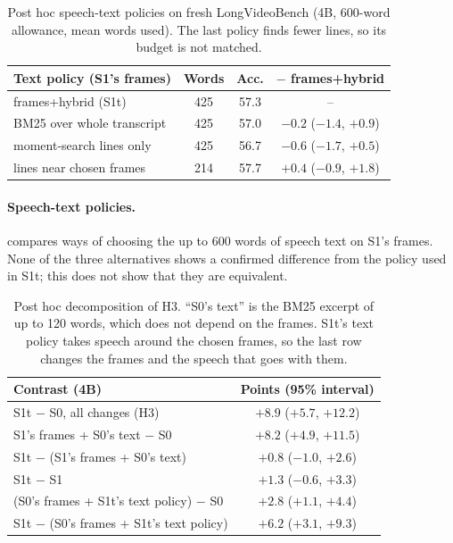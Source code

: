 \begin{table}[t]
\centering
\small
\setlength{\tabcolsep}{4pt}
\begin{tabular}{@{}lccc@{}}
\toprule
Text policy (S1's frames) & Words & Acc. & $-$ frames+hybrid \\
\midrule
frames+hybrid (S1t) & 425 & 57.3 & -- \\
BM25 over whole transcript & 425 & 57.0 & $-0.2$ ($-1.4$, $+0.9$) \\
moment-search lines only & 425 & 56.7 & $-0.6$ ($-1.7$, $+0.5$) \\
lines near chosen frames & 214 & 57.7 & $+0.4$ ($-0.9$, $+1.8$) \\
\bottomrule
\end{tabular}
\caption{Post hoc speech-text policies on fresh LongVideoBench (4B, 600-word allowance, mean words used). The last policy finds fewer lines, so its budget is not matched.}
\label{tab:s-text}
\end{table}

\paragraph{Speech-text policies.}
 compares ways of choosing the up to 600 words of speech text on S1's frames.
None of the three alternatives shows a confirmed difference from the policy used in S1t; this does not show that they are equivalent.

\begin{table}[t]
\centering
\small
\setlength{\tabcolsep}{4pt}
\begin{tabular}{@{}lc@{}}
\toprule
Contrast (4B) & Points (95\% interval) \\
\midrule
S1t $-$ S0, all changes (H3) & $+8.9$ ($+5.7$, $+12.2$) \\
S1's frames + S0's text $-$ S0 & $+8.2$ ($+4.9$, $+11.5$) \\
S1t $-$ (S1's frames + S0's text) & $+0.8$ ($-1.0$, $+2.6$) \\
S1t $-$ S1 & $+1.3$ ($-0.6$, $+3.3$) \\
(S0's frames + S1t's text policy) $-$ S0 & $+2.8$ ($+1.1$, $+4.4$) \\
S1t $-$ (S0's frames + S1t's text policy) & $+6.2$ ($+3.1$, $+9.3$) \\
\bottomrule
\end{tabular}
\caption{Post hoc decomposition of H3. ``S0's text'' is the BM25 excerpt of up to 120 words, which does not depend on the frames. S1t's text policy takes speech around the chosen frames, so the last row changes the frames and the speech that goes with them.}
\label{tab:s-decomp}
\end{table}

